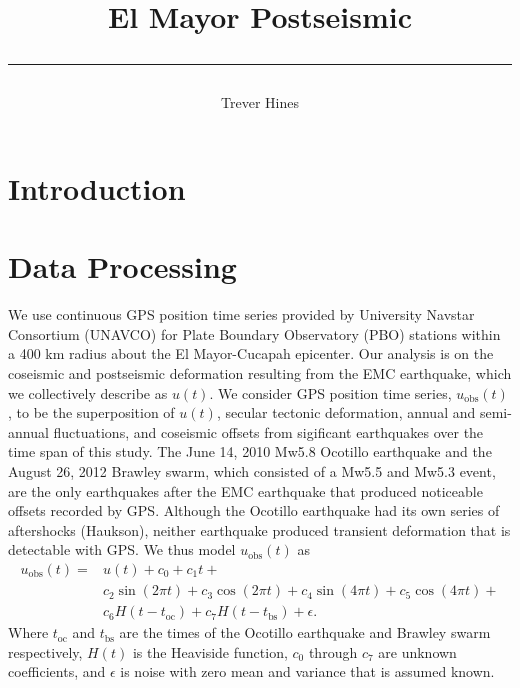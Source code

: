 \documentclass[12pt]{article}
\title{	
El Mayor Postseismic
\author{Trever Hines}
\rule{\headwidth}{1.0pt}
}
\begin{document}
\maketitle
\section*{Introduction}

\section*{Data Processing}

  We use continuous GPS position time series provided by University
  Navstar Consortium (UNAVCO) for Plate Boundary Observatory (PBO)
  stations within a 400 km radius about the El Mayor-Cucapah
  epicenter. Our analysis is on the coseismic and postseismic
  deformation resulting from the EMC earthquake, which we collectively
  describe as $u(t)$. We consider GPS position time series,
  $u_\mathrm{obs}(t)$, to be the superposition of $u(t)$, secular
  tectonic deformation, annual and semi-annual fluctuations, and
  coseismic offsets from sigificant earthquakes over the time span of
  this study.  The June 14, 2010 Mw5.8 Ocotillo earthquake and the
  August 26, 2012 Brawley swarm, which consisted of a Mw5.5 and Mw5.3
  event, are the only earthquakes after the EMC earthquake that
  produced noticeable offsets recorded by GPS. Although the Ocotillo
  earthquake had its own series of aftershocks (Haukson), neither
  earthquake produced transient deformation that is detectable with
  GPS. We thus model $u_\mathrm{obs}(t)$ as 
  \begin{equation}\label{TimeSeriesModel}
  \begin{split}  
    u_\mathrm{obs}(t) = &u(t) + c_0 + c_1t + \\
                       &c_2\sin(2\pi t) + c_3\cos(2\pi t) + c_4\sin(4\pi t) + c_5\cos(4\pi t) + \\
                       &c_6H(t-t_\mathrm{oc}) + c_7H(t-t_\mathrm{bs}) + \epsilon.
  \end{split}
  \end{equation}
  Where $t_\mathrm{oc}$ and $t_\mathrm{bs}$ are the times of the
  Ocotillo earthquake and Brawley swarm respectively, $H(t)$ is the
  Heaviside function, $c_0$ through $c_7$ are unknown coefficients,
  and $\epsilon$ is noise with zero mean and variance that is assumed
  known.
\end{document}
